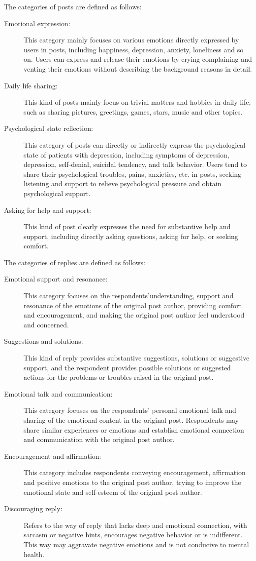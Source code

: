 The categories of posts are defined as follows:
\begin{description}
\item[Emotional expression: ] This category mainly focuses on various emotions directly expressed by users in posts, including happiness, depression, anxiety, loneliness and so on. Users can express and release their emotions by crying complaining and venting their emotions without describing the background reasons in detail.
\item[Daily life sharing: ] This kind of posts mainly focus on trivial matters and hobbies in daily life, such as sharing pictures, greetings, games, stars, music and other topics.
\item[Psychological state reflection: ] This category of posts can directly or indirectly express the psychological state of patients with depression, including symptoms of depression, depression, self-denial, suicidal tendency, and talk behavior. Users tend to share their psychological troubles, pains, anxieties, etc. in posts, seeking listening and support to relieve psychological pressure and obtain psychological support.
\item[Asking for help and support: ] This kind of post clearly expresses the need for substantive help and support, including directly asking questions, asking for help, or seeking comfort.
\end{description}
The categories of replies are defined as follows:
\begin{description}
\item[Emotional support and resonance: ] This category focuses on the respondents’understanding, support and resonance of the emotions of the original post author, providing comfort and encouragement, and making the original post author feel understood and concerned.
\item[Suggestions and solutions: ] This kind of reply provides substantive suggestions, solutions or suggestive support, and the respondent provides possible solutions or suggested actions for the problems or troubles raised in the original post.
\item[Emotional talk and communication: ] This category focuses on the respondents’ personal emotional talk and sharing of the emotional content in the original post. Respondents may share similar experiences or emotions and establish emotional connection
and communication with the original post author.
\item[Encouragement and affirmation: ] This category includes respondents conveying encouragement, affirmation and positive emotions to the original post author, trying to improve the emotional state and self-esteem of the original post author.
\item[Discouraging reply: ] Refers to the way of reply that lacks
deep and emotional connection, with sarcasm or negative hints, encourages negative behavior or is indifferent. This way may aggravate negative emotions and is not conducive to mental health.
\end{description}

